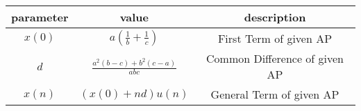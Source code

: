 
  \centering
  \begin{tabular}{|c|c|c|}
  \hline
    parameter & value & description \\
    \hline
    $x(0)$ & $a\left(\frac{1}{b} + \frac{1}{c}\right)$ & First Term of given AP \\
    \hline
    $d$ & $\frac{a^2(b-c)+b^2(c-a)}{abc}$ & Common Difference of given AP \\
    \hline
    $x(n)$ & $(x(0) + nd)u(n)$ & General Term of given AP \\
    \hline
  \end{tabular}

